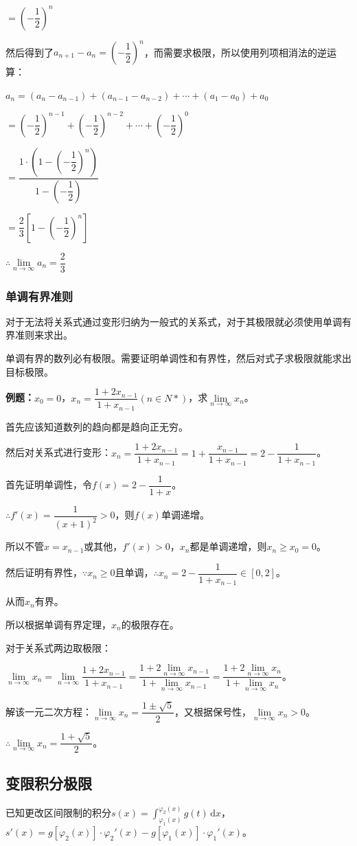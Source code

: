 $= \left(-\dfrac{1}{2}\right)^n$

然后得到了$a_{n+1}-a_n=\left(-\dfrac{1}{2}\right)^n$，而需要求极限，所以使用列项相消法的逆运算：

$a_n= (a_n-a_{n-1})+(a_{n-1}-a_{n-2})+\cdots+(a_1-a_0)+a_0$\medskip

$= \left(-\dfrac{1}{2}\right)^{n-1} + \left(-\dfrac{1}{2}\right)^{n-2} + \cdots + \left(-\dfrac{1}{2}\right)^0$\medskip

$= \dfrac{1\cdot\left(1-\left(-\dfrac{1}{2}\right)^n\right)}{1-\left(-\dfrac{1}{2}\right)}$\medskip

$= \dfrac{2}{3}\left[1-\left(-\dfrac{1}{2}\right)^n\right]$\medskip

$\therefore\lim\limits_{n\to\infty}a_n=\dfrac{2}{3}$

\subsubsection{单调有界准则}

对于无法将关系式通过变形归纳为一般式的关系式，对于其极限就必须使用单调有界准则来求出。

单调有界的数列必有极限。需要证明单调性和有界性，然后对式子求极限就能求出目标极限。

\textbf{例题：}$x_0=0$，$x_n=\dfrac{1+2x_{n-1}}{1+x_{n-1}}(n\in N*)$，求$\lim\limits_{n\to\infty}x_n$。\medskip

首先应该知道数列的趋向都是趋向正无穷。

然后对关系式进行变形：$x_n=\dfrac{1+2x_{n-1}}{1+x_{n-1}}=1+\dfrac{x_{n-1}}{1+x_{n-1}}=2-\dfrac{1}{1+x_{n-1}}$。

首先证明单调性，令$f(x)=2-\dfrac{1}{1+x}$。

$\therefore f'(x)=\dfrac{1}{(x+1)^2}>0$，则$f(x)$单调递增。

所以不管$x=x_{n-1}$或其他，$f'(x)>0$，$x_n$都是单调递增，则$x_n\geqslant x_0=0$。

然后证明有界性，$\because x_n\geqslant 0$且单调，$\therefore x_n=2-\dfrac{1}{1+x_{n-1}}\in[0,2]$。

从而$x_n$有界。

所以根据单调有界定理，$x_n$的极限存在。

对于关系式两边取极限：

$\lim\limits_{n\to\infty}x_n=\lim\limits_{n\to\infty}\dfrac{1+2x_{n-1}}{1+x_{n-1}}=\dfrac{1+2\lim\limits_{n\to\infty}x_{n-1}}{1+\lim\limits_{n\to\infty}x_{n-1}}=\dfrac{1+2\lim\limits_{n\to\infty}x_n}{1+\lim\limits_{n\to\infty}x_n}$。

解该一元二次方程：$\lim\limits_{n\to\infty}x_n=\dfrac{1\pm\sqrt{5}}{2}$，又根据保号性，$\lim\limits_{n\to\infty}x_n>0$。

$\therefore\lim\limits_{n\to\infty}x_n=\dfrac{1+\sqrt{5}}{2}$。

\subsection{变限积分极限}

已知更改区间限制的积分$s(x)=\int_{\varphi_1(x)}^{\varphi_2(x)}g(t)\,\textrm{d}x$，$s'(x)=g[\varphi_2(x)]\cdot\varphi_2'(x)-g[\varphi_1(x)]\cdot\varphi_1'(x)$。
